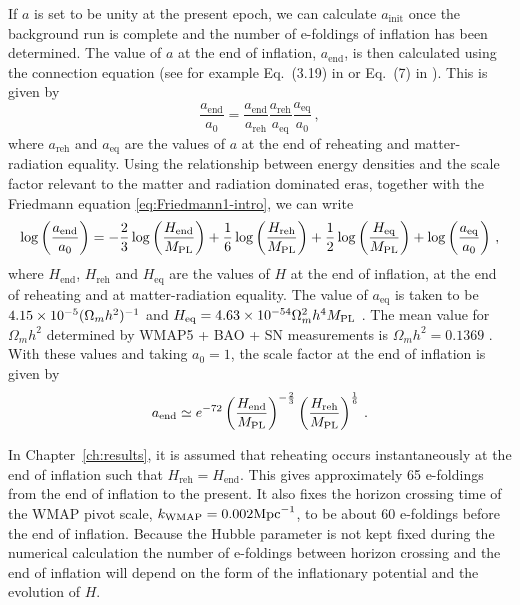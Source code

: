 If $a$ is set to be unity at the present epoch, we can calculate
$a_{\mathrm{init}}$ once the background run is complete and the number of e-foldings
of inflation has been determined.
The value of $a$ at the end of inflation, $a_\mathrm{end}$, is then calculated using
the
connection equation (see for example
Eq.~(3.19) in  or Eq.~(7) in ). 
This is given by
% 
\begin{equation}
 \label{eq:connection-num}
\frac{a_\mathrm{end}}{a_0} = \frac{a_\mathrm{end}}{a_\mathrm{reh}}
			     \frac{a_\mathrm{reh}}{a_\mathrm{eq}}
			     \frac{a_\mathrm{eq}}{a_\mathrm{0}}\,,
\end{equation}
% 
where $a_\mathrm{reh}$ and $a_\mathrm{eq}$ are the values of $a$ at the end of
reheating and matter-radiation equality. Using the relationship between energy
densities and the scale factor relevant to the matter and radiation dominated
eras, together with the Friedmann
equation \eqref{eq:Friedmann1-intro}, we can write
% 
\begin{equation}
 \label{eq:conn2-num}
\log\left(\frac{a_\mathrm{end}}{a_0}\right) =
 -\frac{2}{3}\log\left(\frac{H_\mathrm{end}}{M_{\mathrm{PL}}}\right)
 + \frac{1}{6}\log\left(\frac{H_\mathrm{reh}}{M_{\mathrm{PL}}}\right)
 + \frac{1}{2}\log\left(\frac{H_\mathrm{eq}}{M_{\mathrm{PL}}}\right)
 + \log\left(\frac{a_\mathrm{eq}}{a_0}\right)\,,
\end{equation}
% 
where $H_\mathrm{end}$, $H_\mathrm{reh}$ and $H_\mathrm{eq}$ are the values of $H$
at the end of inflation, at the end of reheating and at matter-radiation equality.
The value
of $a_\mathrm{eq}$ is taken to be $4.15\times 10^{-5} (\Omega_m h^2)^{-1}$ and
$H_\mathrm{eq}=4.63\times 10^{-54} \Omega_m^2 h^4 M_{\mathrm{PL}}$ \cite{Peiris:2008be, book:dodelson}.
The mean value for $\Omega_m h^2$ determined by WMAP5 + BAO + SN measurements is
$\Omega_m h^2 =0.1369$ \cite{Komatsu:2008hk}. With these values and taking
$a_0=1$, the scale factor at the end of inflation is given by
% 
\begin{equation}
\label{eq:aend-num}
a_\mathrm{end} \simeq e^{-72}
\left(\frac{H_\mathrm{end}}{M_{\mathrm{PL}}}\right)^{-\frac{2}{3}} 
\left(\frac{H_\mathrm{reh}}{M_{\mathrm{PL}}}\right)^{\frac{1}{6}}\,.
\end{equation}
% 


In Chapter~\ref{ch:results}, it is assumed that
reheating occurs instantaneously at the end of
inflation such that $H_\mathrm{reh} = H_\mathrm{end}$. This gives approximately 65
e-foldings from the end of inflation to the present. It also fixes the horizon
crossing
time of the WMAP pivot scale, $k_\mathrm{WMAP}=0.002\mathrm{Mpc}^{-1}$, to be about 60 e-foldings
before
the end of inflation. Because the Hubble parameter is not kept fixed during the
numerical calculation the
number of e-foldings between horizon crossing and the end of inflation will depend
on the form of the inflationary potential and the evolution of $H$. 


